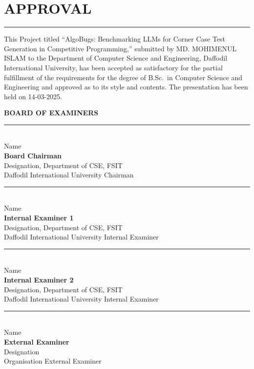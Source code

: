 \chapter*{APPROVAL}
\thispagestyle{plain}
\noindent\rule{\linewidth}{0.5pt}
\setlength{\parskip}{0pt}

This Project titled ``AlgoBugs: Benchmarking LLMs for Corner Case Test Generation in Competitive Programming,'' submitted by MD. MOHIMENUL ISLAM to the Department of Computer Science and Engineering, Daffodil International University, has been accepted as satisfactory for the partial fulfillment of the requirements for the degree of B.Sc.\ in Computer Science and Engineering and approved as to its style and contents. The presentation has been held on 14-03-2025.

\vspace{0.5cm}
\begin{center}
\textbf{\Large BOARD OF EXAMINERS}
\end{center}
\vspace{0.5cm}

\rule{\linewidth}{0.5pt}\\[0.2cm]
Name\\
\textbf{Board Chairman}\\
Designation, Department of CSE, FSIT\\
Daffodil International University
\hfill Chairman

\vspace{0.5cm}

\rule{\linewidth}{0.5pt}\\[0.2cm]
Name\\
\textbf{Internal Examiner 1}\\
Designation, Department of CSE, FSIT\\
Daffodil International University
\hfill Internal Examiner

\vspace{0.5cm}

\rule{\linewidth}{0.5pt}\\[0.2cm]
Name\\
\textbf{Internal Examiner 2}\\
Designation, Department of CSE, FSIT\\
Daffodil International University
\hfill Internal Examiner

\vspace{0.5cm}

\rule{\linewidth}{0.5pt}\\[0.2cm]
Name\\
\textbf{External Examiner}\\
Designation\\
Organisation
\hfill External Examiner
